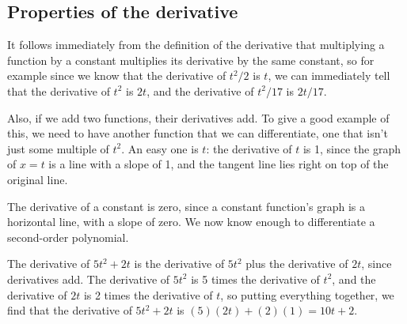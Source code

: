 \subsection{Properties of the derivative}

It follows immediately from the definition of the derivative that multiplying a function by
a constant multiplies its derivative by the same constant, so for example since we know
that the derivative of $t^2/2$ is $t$, we can immediately tell that the derivative of
$t^2$ is $2t$, and the derivative of $t^2/17$ is $2t/17$.

Also, if we add two functions, their derivatives add. To give a good example of this, we
need to have another function that we can differentiate, one that isn't just some multiple
of $t^2$. An easy one is $t$: the derivative of $t$ is 1, since the graph
of $x=t$ is a line with a slope of 1, and the tangent line lies right on top of the
original line.

The derivative of a constant is zero, since a constant function's graph is a
horizontal line, with a slope of zero. We now know enough to differentiate a second-order
polynomial.

\begin{eg}\label{eg:diff-quadratic}
The derivative of $5t^2+2t$ is the derivative of $5t^2$ plus the derivative of
$2t$, since derivatives add. The derivative of $5t^2$ is 5 times the derivative
of $t^2$, and the derivative of $2t$ is 2 times the derivative of $t$, so
putting everything together, we find that the derivative of $5t^2+2t$
is $(5)(2t)+(2)(1)=10t+2$.
\end{eg}

